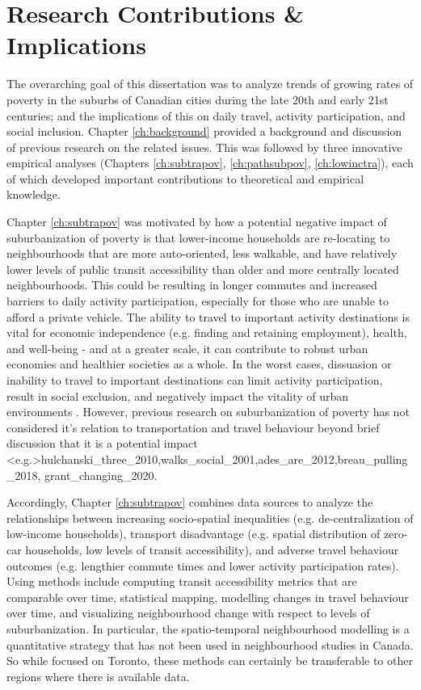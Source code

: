 
\section{Research Contributions \& Implications}

The overarching goal of this dissertation was to analyze trends of growing rates of poverty in the suburbs of Canadian cities during the late 20th and early 21st centuries; and the implications of this on daily travel, activity participation, and social inclusion. Chapter \ref{ch:background} provided a background and discussion of previous research on the related issues. This was followed by three innovative empirical analyses (Chapters \ref{ch:subtrapov}, \ref{ch:pathsubpov}, \ref{ch:lowinctra}), each of which developed important contributions to theoretical and empirical knowledge.

Chapter \ref{ch:subtrapov} was motivated by how a potential negative impact of suburbanization of poverty is that lower-income households are re-locating to neighbourhoods that are more auto-oriented, less walkable, and have relatively lower levels of public transit accessibility than older and more centrally located neighbourhoods. This could be resulting in longer commutes and increased barriers to daily activity participation, especially for those who are unable to afford a private vehicle. The ability to travel to important activity destinations is vital for economic independence (e.g. finding and retaining employment), health, and well-being - and at a greater scale, it can contribute to robust urban economies and healthier societies as a whole. In the worst cases, dissuasion or inability to travel to important destinations can limit activity participation, result in social exclusion, and negatively impact the vitality of urban environments \cite{lucas_transport_2012,martens_transport_2016}. However, previous research on suburbanization of poverty has not considered it's relation to transportation and travel behaviour beyond brief discussion that it is a potential impact \shortcite<e.g.>{hulchanski_three_2010,walks_social_2001,ades_are_2012,breau_pulling_2018, grant_changing_2020}. 

Accordingly, Chapter \ref{ch:subtrapov} combines data sources to analyze the relationships between increasing socio-spatial inequalities (e.g. de-centralization of low-income households), transport disadvantage (e.g. spatial distribution of zero-car households, low levels of transit accessibility), and adverse travel behaviour outcomes (e.g. lengthier commute times and lower activity participation rates). Using methods include computing transit accessibility metrics that are comparable over time, statistical mapping, modelling changes in travel behaviour over time, and visualizing neighbourhood change with respect to levels of suburbanization. In particular, the spatio-temporal neighbourhood modelling is a quantitative strategy that has not been used in neighbourhood studies in Canada. So while focused on Toronto, these methods can certainly be transferable to other regions where there is available data.

